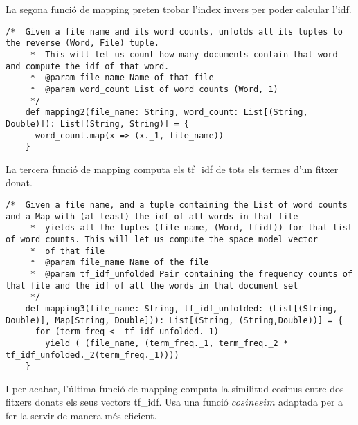 \documentclass{report}
\begin{document}
La segona funció de mapping preten trobar l'index invers per poder calcular l'idf.

\begin{lstlisting}[style=scalaHighlight]
    /*  Given a file name and its word counts, unfolds all its tuples to the reverse (Word, File) tuple.
     *  This will let us count how many documents contain that word and compute the idf of that word.
     *  @param file_name Name of that file
     *  @param word_count List of word counts (Word, 1)
     */
    def mapping2(file_name: String, word_count: List[(String, Double)]): List[(String, String)] = {
      word_count.map(x => (x._1, file_name))
    }
\end{lstlisting}

La tercera funció de mapping computa els tf\_idf de tots els termes d'un fitxer donat.

\begin{lstlisting}[style=scalaHighlight]
/*  Given a file name, and a tuple containing the List of word counts and a Map with (at least) the idf of all words in that file
     *  yields all the tuples (file name, (Word, tfidf)) for that list of word counts. This will let us compute the space model vector
     *  of that file
     *  @param file_name Name of the file
     *  @param tf_idf_unfolded Pair containing the frequency counts of that file and the idf of all the words in that document set
     */
    def mapping3(file_name: String, tf_idf_unfolded: (List[(String, Double)], Map[String, Double])): List[(String, (String,Double))] = {
      for (term_freq <- tf_idf_unfolded._1)
        yield ( (file_name, (term_freq._1, term_freq._2 * tf_idf_unfolded._2(term_freq._1))))
    }
\end{lstlisting}

\newpage

I per acabar, l'última funció de mapping computa la similitud cosinus entre dos fitxers donats els seus vectors tf\_idf. Usa una funció $cosinesim$ adaptada per a fer-la servir de manera més eficient.
\end{document}
